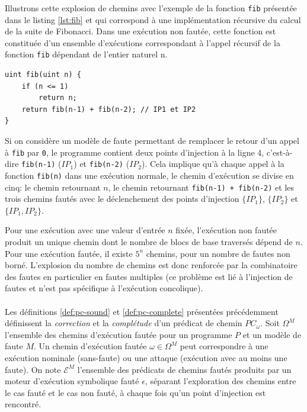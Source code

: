             Illustrons cette explosion de chemins avec l'exemple de la fonction \texttt{fib} présentée dans le listing \ref{lst:fib} et qui correspond à une implémentation récursive du calcul de la suite de Fibonacci. Dans une exécution non fautée, cette fonction est constituée d'un ensemble d'exécutions correspondant à l'appel récursif de la fonction \texttt{fib} dépendant de l'entier naturel n.
    
\begin{lstlisting}[caption=Fonction \texttt{fib}, label=lst:fib]
uint fib(uint n) {
    if (n <= 1)
        return n;
    return fib(n-1) + fib(n-2); // IP1 et IP2
}
\end{lstlisting}  

            Si on considère un modèle de faute permettant de remplacer le retour d'un appel à \texttt{fib} par \texttt{0}, le programme contient deux points d'injection à la ligne 4, c'est-à-dire \texttt{fib(n-1)} ($IP_1$) et \texttt{fib(n-2)} ($IP_2$). Cela implique qu'à chaque appel à la fonction \texttt{fib(n)} dans une exécution normale, le chemin d'exécution se divise en cinq: le chemin retournant $n$, le chemin retournant \texttt{fib(n-1) + fib(n-2)} et les trois chemins fautés avec le déclenchement des points d'injection $\{IP_1\}$, $\{IP_2\}$ et $\{IP_1, IP_2\}$.
            
            Pour une exécution avec une valeur d'entrée $n$ fixée, l'exécution non fautée produit un unique chemin dont le nombre de blocs de base traversés dépend de $n$. Pour une exécution fautée, il existe $5^n$ chemins, pour un nombre de fautes non borné. 
            L'explosion du nombre de chemins est donc renforcée par la combinatoire des fautes en particulier en fautes multiples (ce problème est lié à l'injection de fautes et n'est pas spécifique à l'exécution concolique).
            
            \paragraph{}
            
            Les définitions \ref{def:pc-sound} et \ref{def:pc-complete} présentées précédemment définissent la \textit{correction} et la \textit{complétude} d'un prédicat de chemin $PC_{\omega}$.
            Soit $\Omega^M$ l'ensemble des chemins d'exécution fautée pour un programme $P$ et un modèle de faute $M$. 
            Un chemin d'exécution fautée $\omega \in \Omega^M$ peut correspondre à une exécution nominale (sans-faute) ou une attaque (exécution avec au moins une faute).
            On note $\mathcal{E}^M$ l'ensemble des prédicats de chemins fautés produits par un moteur d'exécution symbolique fauté $\epsilon$, séparant l'exploration des chemins entre le cas fauté et le cas non fauté, à chaque fois qu'un point d'injection est rencontré.
            
